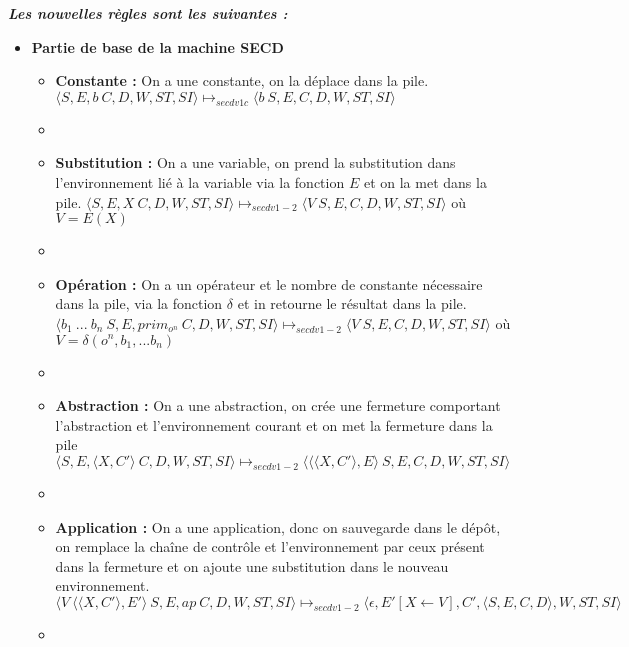 \documentclass[10pt,a4paper]{article}
\begin{document}
					
				\textbf{\textit{Les nouvelles règles sont les suivantes :}}
				\smallbreak
				\begin{itemize}
					\item[] \textbf{Partie de base de la machine SECD}
					\begin{itemize}
						\item[] \textbf{Constante :} On a une constante, on la déplace dans la pile. 
						\smallbreak
						$\langle S,E,b~C,D,W,ST,SI\rangle 
						\longmapsto_{secdv1c} 
						\langle b~S,E,C,D,W,ST,SI\rangle$
						\item[]
						
						\item[] \textbf{Substitution :} On a une variable, on prend la substitution dans l'environnement lié à la variable via la fonction $E$ et on la met dans la pile.  
						\smallbreak 
						$\langle S,E,X~C,D,W,ST,SI\rangle 
						\longmapsto_{secdv1-2} 
						\langle V~S,E,C,D,W,ST,SI\rangle$ 
						où $V = E(X)$
						\item[]
						
						\item[] \textbf{Opération :} On a un opérateur et le nombre de constante nécessaire dans la pile, via la fonction $\delta$ et in retourne le résultat dans la pile. 
						\smallbreak
						$\langle b_{1}~...~b_{n}~S,E,prim_{o^{n}}~C,D,W,ST,SI\rangle 
						\longmapsto_{secdv1-2} 
						\langle V~S,E,C,D,W,ST,SI\rangle$ 
						où $V = \delta(o^{n},b_1,...b_{n})$
						\item[]
						
						\item[] \textbf{Abstraction :} On a une abstraction, on crée une fermeture comportant l'abstraction et l'environnement courant et on met la fermeture dans la pile
						\smallbreak
						$\langle S,E,\langle X,C'\rangle~C,D,W,ST,SI\rangle 
						\longmapsto_{secdv1-2} 
						\langle\langle\langle X,C'\rangle,E\rangle~S,E,C,D,W,ST,SI\rangle$
						\item[]
						
						\item[] \textbf{Application :} On a une application, donc on sauvegarde dans le dépôt, on remplace la chaîne de contrôle et l'environnement par ceux présent dans la fermeture et on ajoute une substitution dans le nouveau environnement.
						\smallbreak
						$\langle V~\langle\langle X,C'\rangle,E'\rangle~S,E,ap~C,D,W,ST,SI\rangle 
						\longmapsto_{secdv1-2} 
						\langle\epsilon,E'[X \leftarrow V],C',\langle S,E,C,D\rangle,W,ST,SI\rangle$
						\item[]
						

\end{itemize}
\end{itemize}
\end{document}
